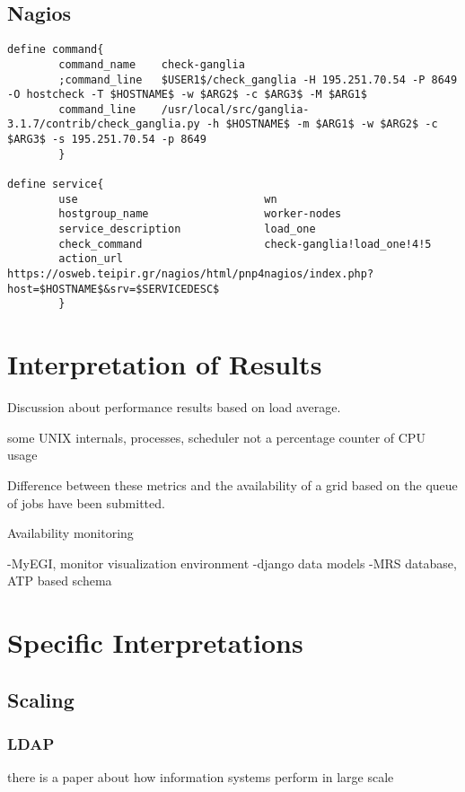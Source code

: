 \subsection{Nagios}

\begin{verbatim}
define command{
        command_name    check-ganglia
        ;command_line   $USER1$/check_ganglia -H 195.251.70.54 -P 8649 -O hostcheck -T $HOSTNAME$ -w $ARG2$ -c $ARG3$ -M $ARG1$
        command_line    /usr/local/src/ganglia-3.1.7/contrib/check_ganglia.py -h $HOSTNAME$ -m $ARG1$ -w $ARG2$ -c $ARG3$ -s 195.251.70.54 -p 8649
        }

define service{
        use                             wn
        hostgroup_name                  worker-nodes
        service_description             load_one
        check_command                   check-ganglia!load_one!4!5
        action_url                      https://osweb.teipir.gr/nagios/html/pnp4nagios/index.php?host=$HOSTNAME$&srv=$SERVICEDESC$
        }
\end{verbatim}

\section{Interpretation of Results}


Discussion about performance results based on
load average.

some UNIX internals, processes, scheduler
not a percentage counter of CPU usage


Difference between these metrics and the availability of 
a grid based on the queue of jobs have been submitted.

Availability monitoring

-MyEGI, monitor visualization environment
-django data models
-MRS database, ATP based schema


\section{Specific Interpretations}

\subsection{Scaling}
\subsubsection{LDAP}

there is a paper about how information systems perform in large scale

